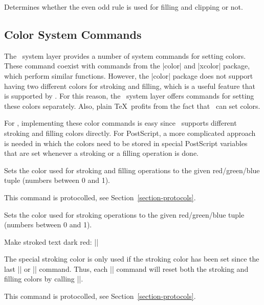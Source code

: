 {\let\ifpgfsys@eorule=\relax
\begin{command}{\ifpgfsys@eorule}
  Determines whether the even odd rule is used for filling and
  clipping or not.
\end{command}
}


\subsection{Color System Commands}

The \pgfname\ system layer provides a number of system commands for
setting colors. These command coexist with commands from the |color|
and |xcolor| package, which perform similar functions. However, the
|color| package does not support having two different colors for
stroking and filling, which is a useful feature that is supported by
\pgfname. For this reason, the \pgfname\ system layer offers commands for
setting these colors separately. Also, plain \TeX\ profits from the
fact that \pgfname\ can set colors.

For \pdf, implementing these color commands is easy since \pdf\
supports different stroking and filling colors directly. For
PostScript, a more complicated approach is needed in which the colors
need to be stored in special PostScript variables that are set
whenever a stroking or a filling operation is done.

\begin{command}{\pgfsys@color@rgb{}}
  Sets the color used for stroking and filling operations to the given
  red/green/blue tuple (numbers between 0 and 1).

  This command is protocolled, see Section~\ref{section-protocols}.
\end{command}

\begin{command}{\pgfsys@color@rgb@stroke{}}
  Sets the color used for stroking operations to the given
  red/green/blue tuple (numbers between 0 and 1).

  \example Make stroked text dark red: ||

  The special stroking color is only used if the stroking color has
  been set since the last |\color| or |\pgfsys@color@xxx|
  command. Thus, each |\color| command will reset both the stroking
  and filling colors by calling |\pgfsys@color@reset|.

  This command is protocolled, see Section~\ref{section-protocols}.
\end{command}

